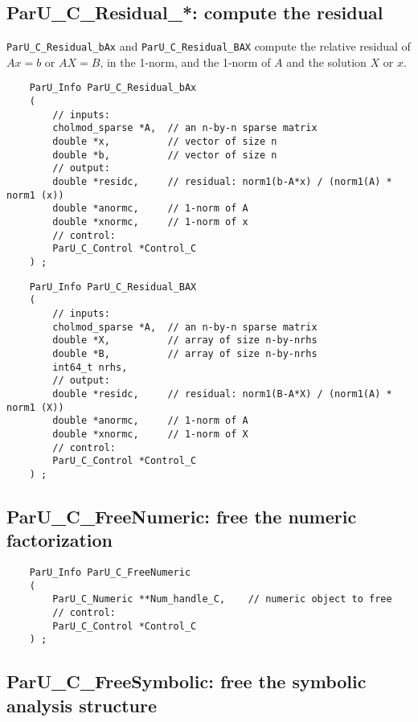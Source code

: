 \documentclass[12pt]{article}
\begin{document}
\subsection{{\sf ParU\_C\_Residual\_*}: compute the residual}

    \verb'ParU_C_Residual_bAx' and \verb'ParU_C_Residual_BAX' compute the
    relative residual of $Ax=b$ or $AX=B$, in the 1-norm, and the 1-norm of $A$
    and the solution $X$ or $x$.

    {\footnotesize
    \begin{verbatim}
    ParU_Info ParU_C_Residual_bAx
    (
        // inputs:
        cholmod_sparse *A,  // an n-by-n sparse matrix
        double *x,          // vector of size n
        double *b,          // vector of size n
        // output:
        double *residc,     // residual: norm1(b-A*x) / (norm1(A) * norm1 (x))
        double *anormc,     // 1-norm of A
        double *xnormc,     // 1-norm of x
        // control:
        ParU_C_Control *Control_C
    ) ; \end{verbatim} }

    {\footnotesize
    \begin{verbatim}
    ParU_Info ParU_C_Residual_BAX
    (
        // inputs:
        cholmod_sparse *A,  // an n-by-n sparse matrix
        double *X,          // array of size n-by-nrhs
        double *B,          // array of size n-by-nrhs
        int64_t nrhs,
        // output:
        double *residc,     // residual: norm1(B-A*X) / (norm1(A) * norm1 (X))
        double *anormc,     // 1-norm of A
        double *xnormc,     // 1-norm of X
        // control:
        ParU_C_Control *Control_C
    ) ; \end{verbatim} }

\subsection{{\sf ParU\_C\_FreeNumeric}: free the numeric factorization}

    {\footnotesize
    \begin{verbatim}
    ParU_Info ParU_C_FreeNumeric
    (
        ParU_C_Numeric **Num_handle_C,    // numeric object to free
        // control:
        ParU_C_Control *Control_C
    ) ; \end{verbatim} }

\subsection{{\sf ParU\_C\_FreeSymbolic}: free the symbolic analysis structure}
\end{document}

